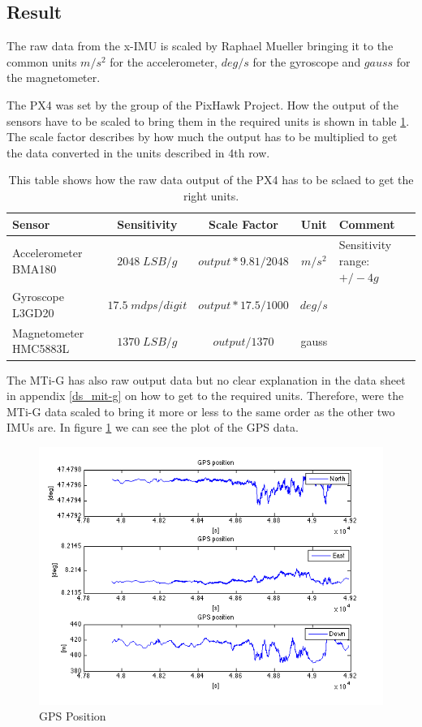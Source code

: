 \subsection{Result}
The raw data from the x-IMU is scaled by Raphael Mueller bringing it to the common units $m/s^2$ for the accelerometer, $deg/s$ for the gyroscope and $gauss$ for the magnetometer.

The PX4 was set by the group of the PixHawk Project. How the output of the sensors have to be scaled to bring them in the required units is shown in table \ref{ct_units_PX4}. The scale factor describes by how much the output has to be multiplied to get the data converted in the units described in 4th row.
\begin{table}[h]
\centering
\begin{tabular}{|p{2.5 cm}|c|c|c|p{3 cm}|}
 \hline
 Sensor & Sensitivity & Scale Factor & Unit & Comment \\
 \hline
 Accelerometer BMA180 & $2048\;LSB/g$ & $output*9.81/2048$ & $m/s^2$ &     Sensitivity range: $+/- 4 g$ \\
 \hline
 Gyroscope L3GD20 & $17.5\;mdps/digit$ & $output*17.5/1000$ & $deg/s$ &   \\
 \hline
 Magnetometer HMC5883L & $1370\;LSB/g$ & $output/1370$ & gauss &   \\
\hline
\end {tabular}
\caption{This table shows how the raw data output of the PX4 has to be sclaed to get the right units.}
\label{ct_units_PX4}
\end{table}
The MTi-G has also raw output data but no clear explanation in the data sheet in appendix \ref{ds_mit-g} on how to get to the required units. Therefore, were the MTi-G data scaled to bring it more or less to the same order as the other two IMUs are.
In figure \ref{ct_pos} we can see the plot of the GPS data.
\begin{figure}[hb]
\begin{center}
\includegraphics[width=1\textwidth]{pictures/ct_pos.png}
\caption{GPS Position}
\label{ct_pos}
\end{center}
\end{figure}
